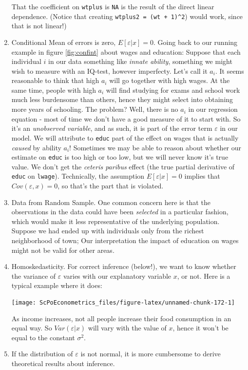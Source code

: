 \documentclass[]{book}
\begin{document}
\begin{enumerate}
  That the coefficient on \texttt{wtplus} is \texttt{NA} is the result of the direct linear dependence. (Notice that creating \texttt{wtplus2\ =\ (wt\ +\ 1)\^{}2}) would work, since that is not linear!)
\item
  Conditional Mean of errors is zero, \(E[\varepsilon|x] = 0\). Going back to our running example in figure \ref{fig:confint} about wages and education: Suppose that each individual \(i\) in our data something like \emph{innate ability}, something we might wish to measure with an IQ-test, however imperfecty. Let's call it \(a_i\). It seems reasonable to think that high \(a_i\) will go together with high wages. At the same time, people with high \(a_i\) will find studying for exams and school work much less burdensome than others, hence they might select into obtaining more years of schooling. The problem? Well, there is no \(a_i\) in our regression equation - most of time we don't have a good measure of it to start with. So it's an \emph{unobserved variable}, and as such, it is part of the error term \(\varepsilon\) in our model. We will attribute to \texttt{educ} part of the effect on wages that is actually \emph{caused} by ability \(a_i\)! Sometimes we may be able to reason about whether our estimate on \texttt{educ} is too high or too low, but we will never know it's true value. We don't get the \emph{ceteris paribus} effect (the true partial derivative of \texttt{educ} on \texttt{lwage}). Technically, the assumption \(E[\varepsilon|x] = 0\) implies that \(Cov(\varepsilon,x) = 0\), so that's the part that is violated.
\item
  Data from Random Sample. One common concern here is that the observations in the data could have been \emph{selected} in a particular fashion, which would make it less representative of the underlying population. Suppose we had ended up with individuals only from the richest neighborhood of town; Our interpretation the impact of education on wages might not be valid for other areas.
\item
  Homoskedasticity. For correct inference (below!), we want to know whether the variance of \(\varepsilon\) varies with our explanatory variable \(x\), or not. Here is a typical example where it does:

  \begin{center}\texttt{[image: ScPoEconometrics\_files/figure-latex/unnamed-chunk-172-1]} \end{center}

  As income increases, not all people increase their food consumption in an equal way. So \(Var(\varepsilon|x)\) will vary with the value of \(x\), hence it won't be equal to the constant \(\sigma^2\).
\item
  If the distribution of \(\varepsilon\) is not normal, it is more cumbersome to derive theoretical results about inference.
\end{enumerate}
\end{document}
